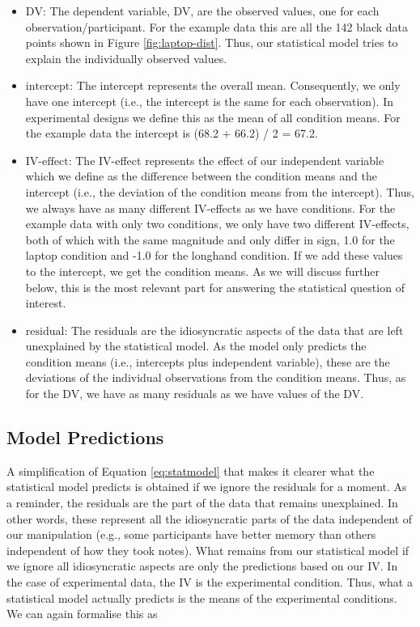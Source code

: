 \documentclass[
]{book}
\begin{document}
\begin{itemize}
\item
  \(\text{DV}\): The dependent variable, DV, are the observed values, one for each observation/participant. For the example data this are all the 142 black data points shown in Figure \ref{fig:laptop-dist}. Thus, our statistical model tries to explain the individually observed values.
\item
  \(\text{intercept}\): The intercept represents the overall mean. Consequently, we only have one intercept (i.e., the intercept is the same for each observation). In experimental designs we define this as the mean of all condition means. For the example data the intercept is (68.2 + 66.2) / 2 = 67.2.
\item
  \(\text{IV-effect}\): The IV-effect represents the effect of our independent variable which we define as the difference between the condition means and the intercept (i.e., the deviation of the condition means from the intercept). Thus, we always have as many different IV-effects as we have conditions. For the example data with only two conditions, we only have two different IV-effects, both of which with the same magnitude and only differ in sign, 1.0 for the laptop condition and -1.0 for the longhand condition. If we add these values to the intercept, we get the condition means. As we will discuss further below, this is the most relevant part for answering the statistical question of interest.
\item
  \(\text{residual}\): The residuals are the idiosyncratic aspects of the data that are left unexplained by the statistical model. As the model only predicts the condition means (i.e., intercepts plus independent variable), these are the deviations of the individual observations from the condition means. Thus, as for the DV, we have as many residuals as we have values of the DV.
\end{itemize}

\hypertarget{model-predictions}{%
\subsection{Model Predictions}\label{model-predictions}}

A simplification of Equation \eqref{eq:statmodel} that makes it clearer what the statistical model predicts is obtained if we ignore the residuals for a moment. As a reminder, the residuals are the part of the data that remains unexplained. In other words, these represent all the idiosyncratic parts of the data independent of our manipulation (e.g., some participants have better memory than others independent of how they took notes). What remains from our statistical model if we ignore all idiosyncratic aspects are only the predictions based on our IV. In the case of experimental data, the IV is the experimental condition. Thus, what a statistical model actually predicts is the means of the experimental conditions. We can again formalise this as
\end{document}
